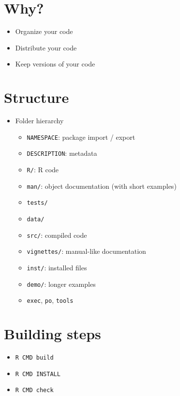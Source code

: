 \documentclass[]{book}
\providecommand{\tightlist}{%
  \setlength{\itemsep}{0pt}\setlength{\parskip}{0pt}}
\theoremstyle{definition}
\theoremstyle{definition}
\theoremstyle{definition}
\theoremstyle{remark}
\begin{document}
\section{Why?}\label{why}

\begin{itemize}
\item
  Organize your code
\item
  Distribute your code
\item
  Keep versions of your code
\end{itemize}

\section{Structure}\label{structure}

\begin{itemize}
\tightlist
\item
  Folder hierarchy

  \begin{itemize}
  \tightlist
  \item
    \texttt{NAMESPACE}: package import / export
  \item
    \texttt{DESCRIPTION}: metadata
  \item
    \texttt{R/}: R code
  \item
    \texttt{man/}: object documentation (with short examples)
  \item
    \texttt{tests/}
  \item
    \texttt{data/}
  \item
    \texttt{src/}: compiled code
  \item
    \texttt{vignettes/}: manual-like documentation
  \item
    \texttt{inst/}: installed files
  \item
    \texttt{demo/}: longer examples
  \item
    \texttt{exec}, \texttt{po}, \texttt{tools}
  \end{itemize}
\end{itemize}

\section{Building steps}\label{building-steps}

\begin{itemize}
\item
  \texttt{R\ CMD\ build}
\item
  \texttt{R\ CMD\ INSTALL}
\item
  \texttt{R\ CMD\ check}
\end{itemize}
\end{document}
